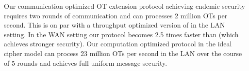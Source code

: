 Our communication optimized OT extension protocol achieving endemic security requires two rounds of communication and can processes 2 million OTs per second. This is on par with a throughput optimized version of \cite{C:KelOrsSch15,libOTe} in the LAN setting. In the WAN setting our protocol becomes 2.5 times faster than \cite{C:KelOrsSch15} (which achieves stronger security). Our computation optimized protocol in the ideal cipher model can process 23 million OTs per second in the LAN over the course of 5 rounds and achieves full uniform message security.

